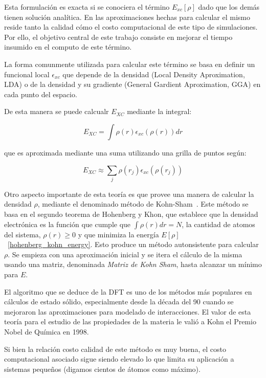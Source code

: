 Esta formulaci\'on es exacta si se conociera el t\'ermino $E_{xc}[\rho]$ dado que los dem\'as tienen soluci\'on anal\'itica. En las aproximaciones hechas para calcular el mismo reside tanto la calidad c\'omo el costo 
computacional de este tipo de simulaciones. Por ello, el objetivo central de este trabajo consiste en mejorar el tiempo insumido en el computo de este t\'ermino.

La forma comunmente utilizada para calcular este t\'ermino se basa en definir un funcional local $\epsilon_{xc}$ que depende de la densidad (Local Density Aproximation, LDA) o de la densidad y su gradiente 
(General Gardient Aproximation, GGA) en cada punto del espacio.

De esta manera se puede calcualr $ E_{XC} $ mediante la integral:

\begin{equation}
    E_{XC} = \int \rho(r) \epsilon_{xc}\left( \rho(r) \right ) dr
\end{equation}

que es aproximada mediante una suma utilizando una grilla de puntos seg\'un:

\begin{equation}
    \label{approx_excenergy}
    E_{XC} \approx \sum_j \rho(r_j) \epsilon_{xc} (\rho(r_j))
\end{equation}

Otro aspecto importante de esta teor\'ia es que provee una manera de calcular la densidad $\rho$,
mediante el denominado m\'etodo de Kohn-Sham~\cite{KohnSham}. Este m\'etodo se basa en el segundo teorema
de Hohenberg y Khon, que establece que la densidad electr\'onica es la funci\'on que
cumple que $\int \rho(r) dr = N$, la cantidad de atomos del sistema, $\rho(r) \geq 0$ y que
minimiza la energ\'ia $E[\rho]$~\ref{hohenberg_kohn_energy}. Esto produce
un m\'etodo autonsistente para calcular $\rho$. Se empieza con una aproximaci\'on inicial y
se itera el c\'alculo de la misma usando una matriz, denominada \textit{Matriz de Kohn Sham}, hasta
alcanzar un m\'inimo para $E$.

El algoritmo que se deduce de la DFT es uno de los m\'etodos m\'as populares en c\'alculos
de estado s\'olido, especialmente desde la d\'ecada del 90 cuando se mejoraron las aproximaciones para modelado de
interacciones. El valor de esta teor\'ia para el estudio de las propiedades de la materia le vali\'o a Kohn el Premio Nobel
de Qu\'imica en 1998.

Si bien la relaci\'on costo calidad de este m\'etodo es muy buena, el costo computacional asociado sigue siendo elevado lo que limita su aplicaci\'on a sistemas peque\~nos (digamos cientos de \'atomos como m\'aximo).


